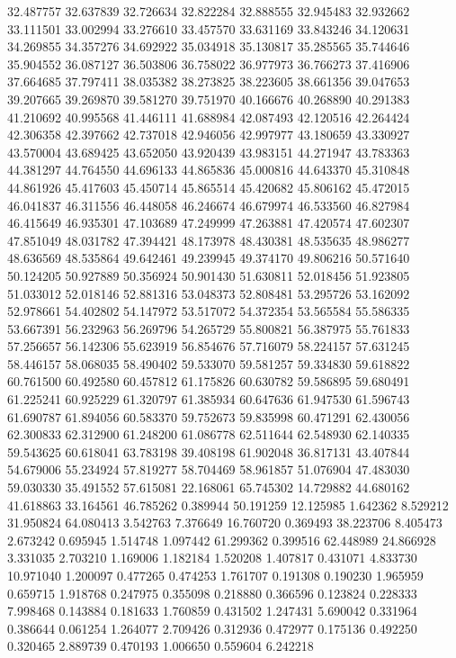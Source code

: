 32.487757
32.637839
32.726634
32.822284
32.888555
32.945483
32.932662
33.111501
33.002994
33.276610
33.457570
33.631169
33.843246
34.120631
34.269855
34.357276
34.692922
35.034918
35.130817
35.285565
35.744646
35.904552
36.087127
36.503806
36.758022
36.977973
36.766273
37.416906
37.664685
37.797411
38.035382
38.273825
38.223605
38.661356
39.047653
39.207665
39.269870
39.581270
39.751970
40.166676
40.268890
40.291383
41.210692
40.995568
41.446111
41.688984
42.087493
42.120516
42.264424
42.306358
42.397662
42.737018
42.946056
42.997977
43.180659
43.330927
43.570004
43.689425
43.652050
43.920439
43.983151
44.271947
43.783363
44.381297
44.764550
44.696133
44.865836
45.000816
44.643370
45.310848
44.861926
45.417603
45.450714
45.865514
45.420682
45.806162
45.472015
46.041837
46.311556
46.448058
46.246674
46.679974
46.533560
46.827984
46.415649
46.935301
47.103689
47.249999
47.263881
47.420574
47.602307
47.851049
48.031782
47.394421
48.173978
48.430381
48.535635
48.986277
48.636569
48.535864
49.642461
49.239945
49.374170
49.806216
50.571640
50.124205
50.927889
50.356924
50.901430
51.630811
52.018456
51.923805
51.033012
52.018146
52.881316
53.048373
52.808481
53.295726
53.162092
52.978661
54.402802
54.147972
53.517072
54.372354
53.565584
55.586335
53.667391
56.232963
56.269796
54.265729
55.800821
56.387975
55.761833
57.256657
56.142306
55.623919
56.854676
57.716079
58.224157
57.631245
58.446157
58.068035
58.490402
59.533070
59.581257
59.334830
59.618822
60.761500
60.492580
60.457812
61.175826
60.630782
59.586895
59.680491
61.225241
60.925229
61.320797
61.385934
60.647636
61.947530
61.596743
61.690787
61.894056
60.583370
59.752673
59.835998
60.471291
62.430056
62.300833
62.312900
61.248200
61.086778
62.511644
62.548930
62.140335
59.543625
60.618041
63.783198
39.408198
61.902048
36.817131
43.407844
54.679006
55.234924
57.819277
58.704469
58.961857
51.076904
47.483030
59.030330
35.491552
57.615081
22.168061
65.745302
14.729882
44.680162
41.618863
33.164561
46.785262
0.389944
50.191259
12.125985
1.642362
8.529212
31.950824
64.080413
3.542763
7.376649
16.760720
0.369493
38.223706
8.405473
2.673242
0.695945
1.514748
1.097442
61.299362
0.399516
62.448989
24.866928
3.331035
2.703210
1.169006
1.182184
1.520208
1.407817
0.431071
4.833730
10.971040
1.200097
0.477265
0.474253
1.761707
0.191308
0.190230
1.965959
0.659715
1.918768
0.247975
0.355098
0.218880
0.366596
0.123824
0.228333
7.998468
0.143884
0.181633
1.760859
0.431502
1.247431
5.690042
0.331964
0.386644
0.061254
1.264077
2.709426
0.312936
0.472977
0.175136
0.492250
0.320465
2.889739
0.470193
1.006650
0.559604
6.242218
